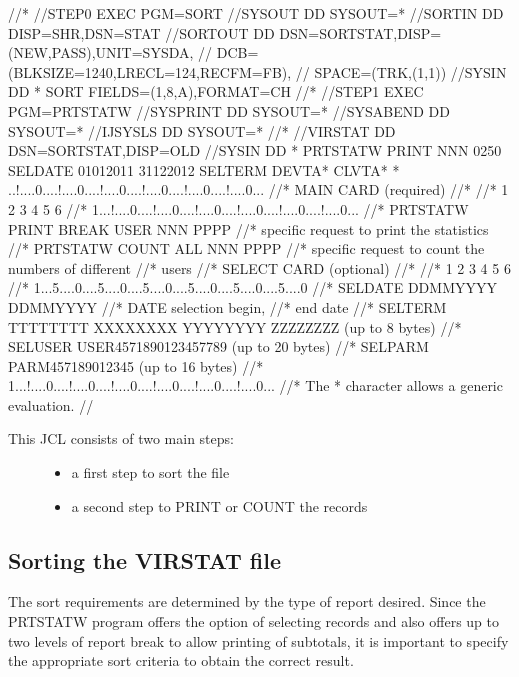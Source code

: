 \documentclass[letterpaper,10pt,english]{sphinxmanual}
\begin{document}
\begin{sphinxVerbatim}[commandchars=\\\{\}]
//*
//STEP0 EXEC PGM=SORT
//SYSOUT DD SYSOUT=*
//SORTIN DD DISP=SHR,DSN=\PYGZam{}STAT
//SORTOUT DD DSN=\PYGZam{}\PYGZam{}SORTSTAT,DISP=(NEW,PASS),UNIT=SYSDA,
// DCB=(BLKSIZE=1240,LRECL=124,RECFM=FB),
// SPACE=(TRK,(1,1))
//SYSIN DD *
SORT FIELDS=(1,8,A),FORMAT=CH
//*
//STEP1 EXEC PGM=PRTSTATW
//SYSPRINT DD SYSOUT=*
//SYSABEND DD SYSOUT=*
//IJSYSLS DD SYSOUT=*
//*
//VIRSTAT DD DSN=\PYGZam{}\PYGZam{}SORTSTAT,DISP=OLD
//SYSIN DD *
PRTSTATW PRINT NNN 0250
SELDATE 01012011 31122012
SELTERM DEVTA* CLVTA*
* ..!....0....!....0....!....0....!....0....!....0....!....0...
//* MAIN CARD (required)
//* \PYGZhy{}\PYGZhy{}\PYGZhy{}\PYGZhy{}\PYGZhy{}\PYGZhy{}\PYGZhy{}\PYGZhy{}\PYGZhy{}
//* 1 2 3 4 5 6
//* 1...!....0....!....0....!....0....!....0....!....0....!....0...
//* PRTSTATW PRINT BREAK USER NNN PPPP
//* specific request to print the statistics
//* PRTSTATW COUNT \PYGZdl{}ALL\PYGZdl{} NNN PPPP
//* specific request to count the numbers of different
//* users
//* SELECT CARD (optional)
//* \PYGZhy{}\PYGZhy{}\PYGZhy{}\PYGZhy{}\PYGZhy{}\PYGZhy{}\PYGZhy{}\PYGZhy{}\PYGZhy{}\PYGZhy{}\PYGZhy{}
//* 1 2 3 4 5 6
//* 1...5....0....5....0....5....0....5....0....5....0....5....0
//* SELDATE DDMMYYYY DDMMYYYY
//* DATE selection begin,
//* end date
//* SELTERM TTTTTTTT XXXXXXXX YYYYYYYY ZZZZZZZZ (up to 8 bytes)
//* SELUSER USER4571890123457789 (up to 20 bytes)
//* SELPARM PARM457189012345 (up to 16 bytes)
//* 1...!....0....!....0....!....0....!....0....!....0....!....0...
//* The \PYGZsq{}*\PYGZsq{} character allows a generic evaluation.
//
\end{sphinxVerbatim}

\begin{description}
\item[{This JCL consists of two main steps:}] \leavevmode\begin{itemize}
\item {} 
a first step to sort the file

\item {} 
a second step to PRINT or COUNT the records

\end{itemize}

\end{description}

\newpage


\subsection{Sorting the VIRSTAT file}
\label{\detokenize{audit_operations_ and_performance:index-88}}\label{\detokenize{audit_operations_ and_performance:sorting-the-virstat-file}}
The sort requirements are determined by the type of report desired. Since the PRTSTATW program offers the option of selecting records and also offers up to two levels of report break to allow printing of subtotals, it is important to specify the appropriate sort criteria to obtain the correct result.
\end{document}
